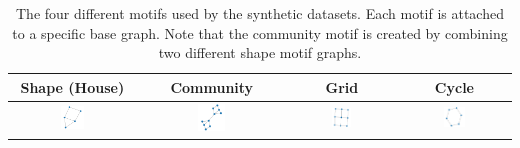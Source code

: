 \begin{table}
    \centering
    \begin{tabular}{cccc}
        \textbf{Shape (House)} &
        \textbf{Community} &
        \textbf{Grid} &
        \textbf{Cycle}\\
        \midrule
        \includegraphics[width=0.2\textwidth]{figures/house.png} &
        \includegraphics[width=0.2\textwidth]{figures/community.png} &
        \includegraphics[width=0.2\textwidth]{figures/grid.png} &
        \includegraphics[width=0.2\textwidth]{figures/cycle.png} \\
    \end{tabular}
    \caption{The four different motifs used by the synthetic datasets. Each motif is attached to a specific base graph. Note that the community motif is created by combining two different shape motif graphs.}
    \label{tab:motifs}
\end{table}

